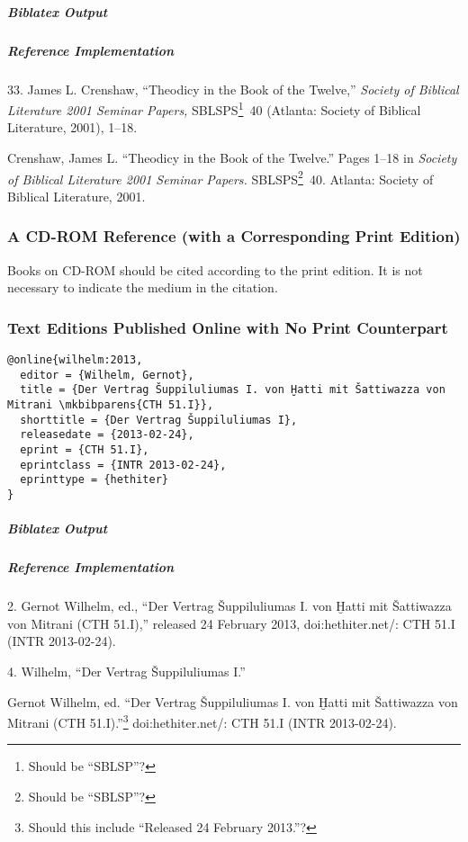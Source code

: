 \documentclass[a4paper]{article}
\newenvironment{biboutput}{%
  \subparagraph{Biblatex Output}
}{\color{black}}
\newenvironment{refimp}{%
  \subparagraph{Reference Implementation}
  \color{reference-colour}
  \rm
}{\par\color{black}}
\begin{document}
\begin{biboutput}
\end{biboutput}

\begin{refimp}
  \hspace*{\bibindent}33. James L. Crenshaw, “Theodicy in the Book of the
  Twelve,” \emph{Society of Biblical Literature 2001 Seminar Papers,}
  SBLSPS\footnote{Should be “SBLSP”?}~40 (Atlanta: Society of Biblical
  Literature, 2001), 1–18.
  
  \hangindent\bibindent Crenshaw, James L. “Theodicy in the Book of the
  Twelve.” Pages 1–18 in \emph{Society of Biblical Literature 2001 Seminar
  Papers.} SBLSPS\footnote{Should be “SBLSP”?}~40. Atlanta: Society of
  Biblical Literature, 2001.

\end{refimp}

\subsubsection{A CD-ROM Reference (with a Corresponding Print Edition)}

Books on CD-ROM should be cited according to the print edition. It is not
necessary to indicate the medium in the citation.

\subsubsection{Text Editions Published Online with No Print Counterpart}

\begin{lstlisting}
@online{wilhelm:2013,
  editor = {Wilhelm, Gernot},
  title = {Der Vertrag Šuppiluliumas I. von Ḫatti mit Šattiwazza von Mitrani \mkbibparens{CTH 51.I}},
  shorttitle = {Der Vertrag Šuppiluliumas I},
  releasedate = {2013-02-24},
  eprint = {CTH 51.I},
  eprintclass = {INTR 2013-02-24},
  eprinttype = {hethiter}
}
\end{lstlisting}

\begin{biboutput}
\end{biboutput}

\begin{refimp}
  \hspace*{\bibindent}2. Gernot Wilhelm, ed., “Der Vertrag Šuppiluliumas I.
  von Ḫatti mit Šattiwazza von Mitrani (CTH 51.I),” released 24 February 2013,
  doi:hethiter.net/: CTH 51.I (INTR 2013-02-24).

  \hspace*{\bibindent}4. Wilhelm, “Der Vertrag Šuppiluliumas I.”

  \hangindent\bibindent Gernot Wilhelm, ed. “Der Vertrag Šuppiluliumas I. von
  Ḫatti mit Šattiwazza von Mitrani (CTH 51.I).”\footnote{Should this include
  “Released 24 February 2013.”?} doi:hethiter.net/: CTH 51.I
  (INTR 2013-02-24).
\end{refimp}
\end{document}
